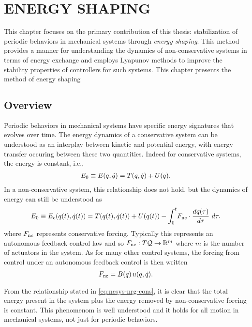 \chapter{\uppercase{Energy Shaping}}

This chapter focuses on the primary contribution of this thesis: stabilization of periodic behaviors in mechanical systems through {\em energy shaping}.
%
This method provides a manner for understanding the dynamics of non-conservative systems in terms of energy exchange and employs Lyapunov methods to improve the stability properties of controllers for such systems.
%
This chapter presents the method of energy shaping 

\section{Overview}

Periodic behaviors in mechanical systems have specific energy signatures that evolves over time.
%
The energy dynamics of a conservative system can be understood as an interplay between kinetic and potential energy, with energy transfer occuring between these two quantities.
%
Indeed for conservative systems, the energy is constant, i.e.,
\begin{align}
  E_{0} \equiv E(q, \dot{q}) = T(q, \dot{q}) + U(q).
\end{align}
%
In a non-conservative system, this relationship does not hold, but the dynamics of energy can still be understood as
\begin{align}
  \label{eq:ncsys-nrg-cons}
  E_{0} \equiv E_{c}(q(t), \dot{q}(t)) = T(q(t), \dot{q}(t)) + U(q(t)) - \int_{0}^{t} \! F_{\mathrm{nc}} \cdot \frac{dq(\tau)}{d\tau} \ d\tau.
\end{align}
where $F_{\mathrm{nc}}$ represents conservative forcing. Typically this represents an autonomous feedback control law and so $F_{\mathrm{nc}} : T\mathcal{Q} \to \mathbb{R}^m$ where $m$ is the number of actuators in the system.
%
As for many other control systems, the forcing from control under an autonomous feedback control is then written
\begin{align}
  F_{\mathrm{nc}} = B(q) \, u(q, \dot{q}).
\end{align}

From the relationship stated in \eqref{eq:ncsys-nrg-cons}, it is clear that the total energy present in the system plus the energy removed by non-conservative forcing is constant.
%
This phenomenom is well understood and it holds for all motion in mechanical systems, not just for periodic behaviors.

